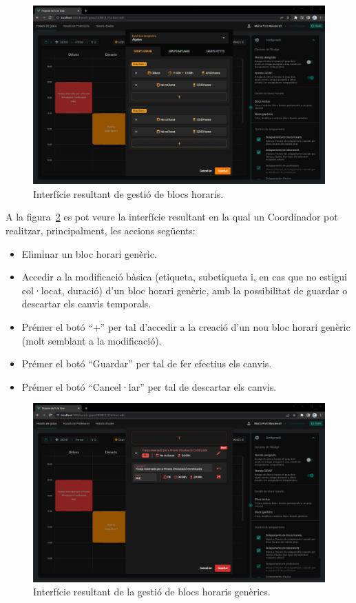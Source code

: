\documentclass[a4paper,12pt]{ThesisStyle}
\begin{document}
\begin{figure}[H]
  \centering
  \includegraphics[width=\textwidth]{assets/results/horaris/creacioBlocs.png}
  \caption{\label{img:resultats_horaris_creacioBlocs}Interfície resultant de gestió de blocs horaris.}
\end{figure}

\newpage

A la figura~\ref{img:resultats_horaris_creacioBlocGeneric} es pot veure la interfície resultant en la qual un Coordinador pot realitzar, principalment, les accions següents:
\begin{itemize}
  \item Eliminar un bloc horari genèric.
  \item Accedir a la modificació bàsica (etiqueta, subetiqueta i, en cas que no estigui col·locat, duració) d'un bloc horari genèric, amb la possibilitat de guardar o descartar els canvis temporals.
  \item Prémer el botó ``+'' per tal d'accedir a la creació d'un nou bloc horari genèric (molt semblant a la modificació).
  \item Prémer el botó ``Guardar'' per tal de fer efectius els canvis.
  \item Prémer el botó ``Cancel·lar'' per tal de descartar els canvis.
\end{itemize}

\begin{figure}[H]
  \centering
  \includegraphics[width=\textwidth]{assets/results/horaris/creacioBlocGeneric.png}
  \caption{\label{img:resultats_horaris_creacioBlocGeneric}Interfície resultant de la gestió de blocs horaris genèrics.}
\end{figure}
\end{document}
